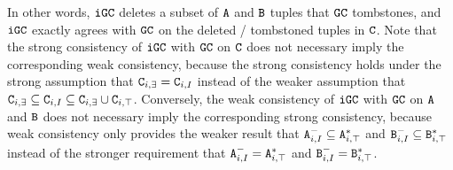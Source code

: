 
In other words, $\tt{iGC}$ deletes a subset of $\tt{A}$ and $\tt{B}$ tuples that $\tt{GC}$ tombstones, and $\tt{iGC}$ exactly agrees with $\tt{GC}$ on the deleted / tombstoned tuples in $\tt{C}$.
Note that the strong consistency of $\tt{iGC}$ with $\tt{GC}$ on $\tt{C}$ does not necessary imply the corresponding weak consistency, because the strong consistency holds under the strong assumption that $\tt{C}_{i,\exists} = \tt{C}_{i,I}$ instead of the weaker assumption that $\tt{C}_{i,\exists} \subseteq \tt{C}_{i,I} \subseteq \tt{C}_{i,\exists} \cup \tt{C}_{i,\top}$.
Conversely, the weak consistency of $\tt{iGC}$ with $\tt{GC}$ on $\tt{A}$ and $\tt{B}$ does not necessary imply the corresponding strong consistency, because weak consistency only provides the weaker result that $\tt{A}_{i,I}^- \subseteq \tt{A}_{i,\top}^*$ and $\tt{B}_{i,I}^- \subseteq \tt{B}_{i,\top}^*$ instead of the stronger requirement that $\tt{A}_{i,I}^- = \tt{A}_{i,\top}^*$ and $\tt{B}_{i,I}^- = \tt{B}_{i,\top}^*$.

